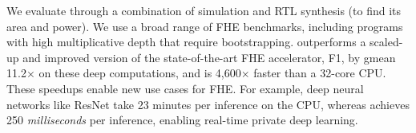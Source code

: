 We evaluate \name through a combination of simulation and RTL synthesis (to find its area and power).
We use a broad range of FHE benchmarks, including programs with high multiplicative depth
that require bootstrapping.
\name outperforms a scaled-up and improved version of the state-of-the-art FHE accelerator, F1, by gmean 
11.2$\times$ on these deep computations,
and is 4,600$\times$ faster than a 32-core CPU.
These speedups enable new use cases for FHE.
For example, deep neural networks like ResNet
take 23 minutes per inference on the CPU,
whereas \name achieves 250 \emph{milliseconds} per inference,
enabling real-time private deep learning.

